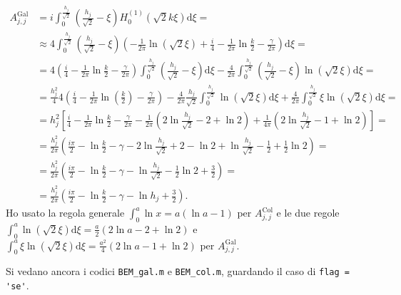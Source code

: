 \begin{align*}
	A_{j,j}^{\text{Gal}} &= i \int_0^{\frac{h_j}{\sqrt{2}}} \left( \frac{h_j}{\sqrt{2}} - \xi \right) H_0^{(1)} (\sqrt{2}k\xi) \mathrm{d}\xi = \\
	&\approx 4 \int_0^{\frac{h_j}{\sqrt{2}}} \left( \frac{h_j}{\sqrt{2}} - \xi \right) \left( -\frac{1}{2\pi}\ln(\sqrt{2}\xi) + \frac{i}{4} - \frac{1}{2\pi}\ln\frac{k}{2} - \frac{\gamma}{2\pi} \right) \mathrm{d}\xi = \\
	&=4 \left( \frac{i}{4} - \frac{1}{2\pi}\ln\frac{k}{2} - \frac{\gamma}{2\pi} \right) \int_0^{\frac{h_j}{\sqrt{2}}} \left( \frac{h_j}{\sqrt{2}} - \xi \right) \mathrm{d}\xi - \frac{4}{2\pi} \int_0^{\frac{h_j}{\sqrt{2}}} \left( \frac{h_j}{\sqrt{2}} - \xi \right) \ln(\sqrt{2}\xi) \mathrm{d}\xi = \\
	&= \frac{h_j^2}{4} 4\left( \frac{i}{4} -\frac{1}{2\pi}\ln(\frac{k}{2}) - \frac{\gamma}{2\pi} \right) - \frac{4}{2\pi} \frac{h_j}{\sqrt{2}} \int_0^{\frac{h_j}{\sqrt{2}}} \ln(\sqrt{2}\xi) \mathrm{d}\xi + \frac{4}{2\pi} \int_0^{\frac{h_j}{\sqrt{2}}} \xi\ln(\sqrt{2}\xi) \mathrm{d}\xi = \\
	&= h_j^2 \left[ \frac{i}{4} - \frac{1}{2\pi}\ln\frac{k}{2} - \frac{\gamma}{2\pi} -\frac{1}{2\pi} \left( 2\ln\frac{h_j}{\sqrt{2}} - 2 + \ln2 \right) + \frac{1}{4\pi} \left( 2 \ln\frac{h_j}{\sqrt{2}} - 1 + \ln2 \right) \right] = \\
	&= \frac{h_j^2}{2\pi} \left( \frac{i\pi}{2} - \ln\frac{k}{2} - \gamma - 2\ln\frac{h_j}{\sqrt{2}} + 2 - \ln2 + \ln\frac{h_j}{\sqrt{2}} - \frac{1}{2} + \frac{1}{2}\ln2 \right) = \\
	&= \frac{h_j^2}{2\pi} \left( \frac{i\pi}{2} - \ln\frac{k}{2} - \gamma - \ln\frac{h_j}{\sqrt{2}} - \frac{1}{2}\ln2 + \frac{3}{2} \right) = \\
	&= \frac{h_j^2}{2\pi} \left( \frac{i\pi}{2} - \ln\frac{k}{2} - \gamma - \ln{h_j} + \frac{3}{2} \right).
\end{align*}
Ho usato la regola generale $\int_0^a \ln x = a(\ln a - 1)$ per $A_{j,j}^{\text{Col}}$ e le due regole $\int_0^a \ln(\sqrt{2}\xi) \mathrm{d}\xi = \frac{a}{2} (2\ln a -2 +\ln2)$ e $\int_0^a \xi\ln(\sqrt{2}\xi) \mathrm{d}\xi = \frac{a^2}{4} (2\ln a -1 + \ln2)$ per $A_{j,j}^{\text{Gal}}$. 

Si vedano ancora i codici \verb|BEM_gal.m| e \verb|BEM_col.m|, guardando il caso di \verb|flag = 'se'|.



